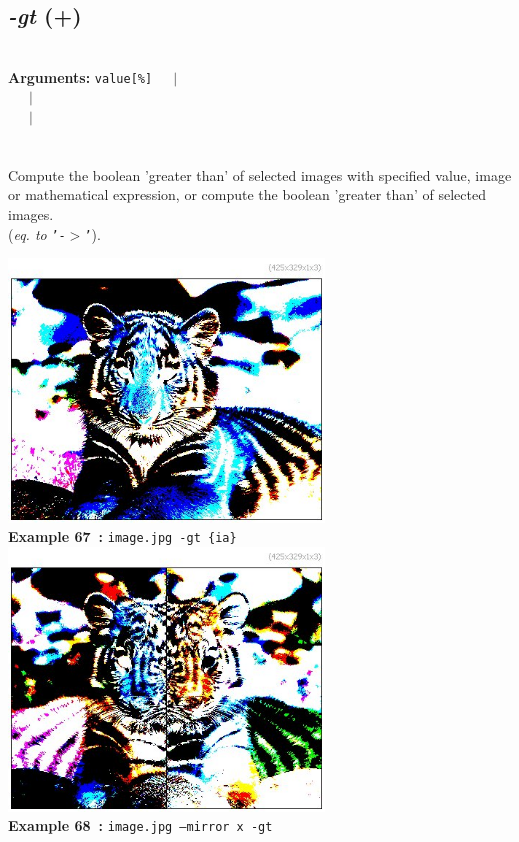 \documentclass[a4paper,11pt,twoside]{book}
\begin{document}
\subsection{\emph{-gt} (+)}\vspace*{-0.5em}
~\\\textbf{Arguments: } 
{\small \texttt{value[\%]}}~~~$|$\\
\hspace*{2.2cm}{\small \texttt{[image]}}~~~$|$\\
~~~$|$\\
\\~\\
Compute the boolean 'greater than' of selected images with specified value, image or
mathematical expression, or compute the boolean 'greater than' of selected images.
~\\(\emph{eq. to} {\small \texttt{'-$>$'}}).
\begin{center}\includegraphics[keepaspectratio=true,height=7cm,width=\textwidth]{img/gmic_def67.jpg}\\
{\footnotesize \textbf{Example 67~:} \texttt{image.jpg -gt \{ia\}}}
\\\includegraphics[keepaspectratio=true,height=7cm,width=\textwidth]{img/gmic_def68.jpg}\\
{\footnotesize \textbf{Example 68~:} \texttt{image.jpg --mirror x -gt}}
\end{center}
\end{document}
